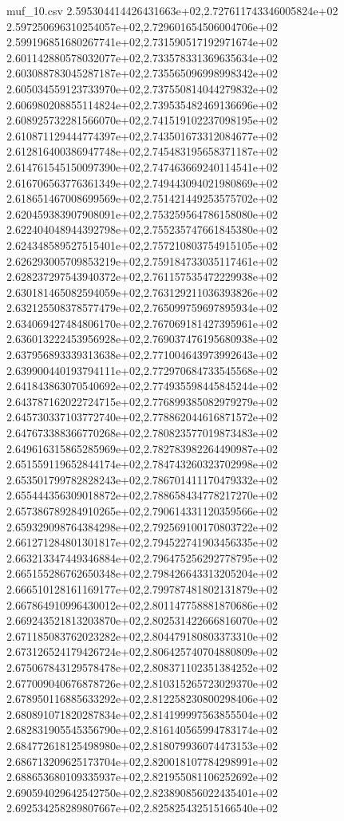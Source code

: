 \begin{filecontents*}{muf_10.csv}
2.595304414426431663e+02,2.727611743346005824e+02
2.597250696310254057e+02,2.729601654506004706e+02
2.599196851680267741e+02,2.731590517192971674e+02
2.601142880578032077e+02,2.733578331369635634e+02
2.603088783045287187e+02,2.735565096998998342e+02
2.605034559123733970e+02,2.737550814044279832e+02
2.606980208855114824e+02,2.739535482469136696e+02
2.608925732281566070e+02,2.741519102237098195e+02
2.610871129444774397e+02,2.743501673312084677e+02
2.612816400386947748e+02,2.745483195658371187e+02
2.614761545150097390e+02,2.747463669240114541e+02
2.616706563776361349e+02,2.749443094021980869e+02
2.618651467008699569e+02,2.751421449253575702e+02
2.620459383907908091e+02,2.753259564786158080e+02
2.622404048944392798e+02,2.755235747661845380e+02
2.624348589527515401e+02,2.757210803754915105e+02
2.626293005709853219e+02,2.759184733035117461e+02
2.628237297543940372e+02,2.761157535472229938e+02
2.630181465082594059e+02,2.763129211036393826e+02
2.632125508378577479e+02,2.765099759697895934e+02
2.634069427484806170e+02,2.767069181427395961e+02
2.636013222453956928e+02,2.769037476195680938e+02
2.637956893339313638e+02,2.771004643973992643e+02
2.639900440193794111e+02,2.772970684733545568e+02
2.641843863070540692e+02,2.774935598445845244e+02
2.643787162022724715e+02,2.776899385082979279e+02
2.645730337103772740e+02,2.778862044616871572e+02
2.647673388366770268e+02,2.780823577019873483e+02
2.649616315865285969e+02,2.782783982264490987e+02
2.651559119652844174e+02,2.784743260323702998e+02
2.653501799782828243e+02,2.786701411170479332e+02
2.655444356309018872e+02,2.788658434778217270e+02
2.657386789284910265e+02,2.790614331120359566e+02
2.659329098764384298e+02,2.792569100170803722e+02
2.661271284801301817e+02,2.794522741903456335e+02
2.663213347449346884e+02,2.796475256292778795e+02
2.665155286762650348e+02,2.798426643313205204e+02
2.666510128161169177e+02,2.799787481802131879e+02
2.667864910996430012e+02,2.801147758881870686e+02
2.669243521813203870e+02,2.802531422666816070e+02
2.671185083762023282e+02,2.804479180803373310e+02
2.673126524179426724e+02,2.806425740704880809e+02
2.675067843129578478e+02,2.808371102351384252e+02
2.677009040676878726e+02,2.810315265723029370e+02
2.678950116885633292e+02,2.812258230800298406e+02
2.680891071820287834e+02,2.814199997563855504e+02
2.682831905545356790e+02,2.816140565994783174e+02
2.684772618125498980e+02,2.818079936074473153e+02
2.686713209625173704e+02,2.820018107784298991e+02
2.688653680109335937e+02,2.821955081106252692e+02
2.690594029642542750e+02,2.823890856022435401e+02
2.692534258289807667e+02,2.825825432515166540e+02

\end{filecontents*}
